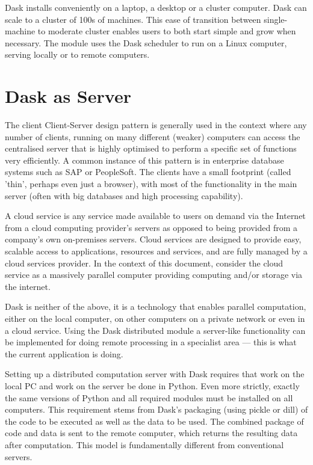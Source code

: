 Dask installs  conveniently  on a laptop, a desktop or a cluster computer. Dask can scale to a cluster of 100s of machines. This ease of transition between single-machine to moderate cluster enables users to both start simple and grow when necessary.  The \libraddask{} module uses the Dask scheduler to run \libradtran{} on a Linux computer, serving locally or to remote computers.

\section{Dask as Server}

The client Client-Server design pattern is generally used in the context where any number of clients, running on many different (weaker) computers can access the centralised server that is highly optimised to perform a specific set of functions very efficiently.  A common instance of this pattern is in enterprise database systems such as SAP or PeopleSoft. The clients have a small footprint (called 'thin', perhaps even just a browser), with most of the functionality in the main server (often with big databases and high processing capability).

A cloud service is any service made available to users on demand via the Internet from a cloud computing provider's servers as opposed to being provided from a company's own on-premises servers. Cloud services are designed to provide easy, scalable access to applications, resources and services, and are fully managed by a cloud services provider.
In the context of this document, consider the cloud service as a massively parallel computer providing computing and/or storage via the internet.

Dask is neither of the above, it is a technology that enables parallel computation, either on the local computer, on other computers on a private network or even in a cloud service.
Using the Dask distributed module a server-like functionality can be implemented  for doing remote processing in a specialist area --- this is what the current application is doing.

Setting up a distributed computation server with Dask requires that work on the local PC and work on the server be done in Python. Even more strictly, exactly the same versions of Python and all required modules must be installed on all computers.  This requirement stems from Dask's packaging (using pickle or dill) of the code to be executed as well as the data to be used. The combined package of code and data is sent to the remote computer, which returns the resulting data after computation. This model is fundamentally different from conventional servers.

